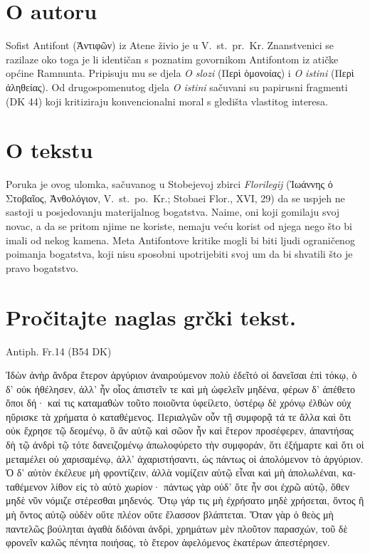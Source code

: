 \section*{O autoru}

Sofist Antifont \textgreek[variant=ancient]{(Ἀντιφῶν)} iz Atene živio je u V.~st.\ pr.~Kr. Znanstvenici se razilaze oko toga je li identičan s poznatim govornikom Antifontom iz atičke općine Ramnunta. Pripisuju mu se djela \textit{O slozi} \textgreek[variant=ancient]{(Περὶ ὁμονοίας)} i \textit{O istini} (\textgreek[variant=ancient]{Περὶ ἀληθείας}). Od drugospomenutog djela \textit{O istini} sačuvani su papirusni fragmenti (DK 44) koji kritiziraju konvencionalni moral s gledišta vlastitog interesa.

\section*{O tekstu}

Poruka je ovog ulomka, sačuvanog u Stobejevoj zbirci \textit{Florilegij} \textgreek[variant=ancient]{(Ἰωάννης ὁ Στοβαῖος,  Ἀνθολόγιον,} V.~st.\ po.~Kr.; Stobaei Flor., XVI, 29) da se uspjeh ne sastoji u posjedovanju materijalnog bogatstva. Naime, oni koji gomilaju svoj novac, a da se pritom njime ne koriste, nemaju veću korist od njega nego što bi imali od nekog kamena. Meta Antifontove kritike mogli bi biti ljudi ograničenog poimanja bogatstva, koji nisu sposobni upotrijebiti svoj um da bi shvatili što je pravo bogatstvo.


\section*{Pročitajte naglas grčki tekst.}

Antiph. Fr.14 (B54 DK)


\medskip

\begin{greek}
{\large
{ \noindent Ἰδὼν ἀνὴρ ἄνδρα ἕτερον ἀργύριον ἀναιρούμενον πολὺ ἐδεῖτό οἱ δανεῖσαι ἐπὶ τόκῳ, ὁ δ' οὐκ ἠθέλησεν, ἀλλ' ἦν οἷος ἀπιστεῖν τε καὶ μὴ ὠφελεῖν μηδένα, φέρων δ' ἀπέθετο ὅποι δή· καί τις καταμαθὼν τοῦτο ποιοῦντα ὑφείλετο, ὑστέρῳ δὲ χρόνῳ ἐλθὼν οὐχ ηὕρισκε τὰ χρήματα ὁ καταθέμενος. Περιαλγῶν οὖν τῇ συμφορᾷ τά τε ἄλλα καὶ ὅτι οὐκ ἔχρησε τῷ δεομένῳ, ὃ ἂν αὐτῷ καὶ σῶον ἦν καὶ ἕτερον προσέφερεν, ἀπαντήσας δὴ τῷ ἀνδρὶ τῷ τότε δανειζομένῳ ἀπωλοφύρετο τὴν συμφοράν, ὅτι ἐξήμαρτε καὶ ὅτι οἱ μεταμέλει οὐ χαρισαμένῳ, ἀλλ' ἀχαριστήσαντι, ὡς πάντως οἱ ἀπολόμενον τὸ ἀργύριον. Ὁ δ' αὐτὸν ἐκέλευε μὴ φροντίζειν, ἀλλὰ νομίζειν αὑτῷ εἶναι καὶ μὴ ἀπολωλέναι, καταθέμενον λίθον εἰς τὸ αὐτὸ χωρίον· πάντως γὰρ οὐδ' ὅτε ἦν σοι ἐχρῶ αὐτῷ, ὅθεν μηδὲ νῦν νόμιζε στέρεσθαι μηδενός. Ὅτῳ γάρ τις μὴ ἐχρήσατο μηδὲ χρήσεται, ὄντος ἢ μὴ ὄντος αὐτῷ οὐδὲν οὔτε πλέον οὔτε ἔλασσον βλάπτεται. Ὅταν γὰρ ὁ θεὸς μὴ παντελῶς βούληται ἀγαθὰ διδόναι ἀνδρὶ, χρημάτων μὲν πλοῦτον παρασχών, τοῦ δὲ φρονεῖν καλῶς πένητα ποιήσας, τὸ ἕτερον ἀφελόμενος ἑκατέρων ἀπεστέρησεν.

}
}
\end{greek}

